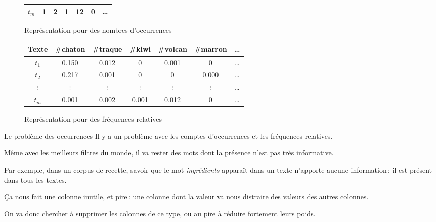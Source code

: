 \documentclass[../allslides.tex]{subfiles}
\begin{document}
\begin{frame}
\begin{overprint}
\begin{figure}
\begin{tabular}{c*{5}{S[table-format=4.0]}c}
					\(t_m\)	& 1	& 2	& 1	& 12	& 0	& …\\
					\bottomrule
				\end{tabular}
				\caption{Représentation pour des nombres d'occurrences}
			\end{figure}
			\begin{figure}
				\begin{tabular}{c*{5}{S}c}
					\toprule
					\textbf{Texte}	& {\textbf{\#chaton}}	& {\textbf{\#traque}}	& {\textbf{\#kiwi}}	& {\textbf{\#volcan}}	& {\textbf{\#marron}}	& {…}\\
					\midrule
					\(t_1\)	& 0.150	& 0.012	& 0	& 0.001	& 0	& …\\
					\(t_2\)	& 0.217	& 0.001	& 0	& 0	& 0.000	& …\\
					\(⋮\)	& \multicolumn{1}{c}{\(⋮\)}	& 	& 	& 	& 	& …\\
					\(t_m\)	& 0.001	& 0.002	& 0.001	& 0.012	& 0	& …\\
					\bottomrule
				\end{tabular}
				\caption{Représentation pour des fréquences relatives}
			\end{figure}
	\end{overprint}
\end{frame}




\begin{frame}{Le problème des occurrences}
	Il y a un problème avec les comptes d'occurrences et les fréquences relatives.

	\pause

	Même avec les meilleurs filtres du monde, il va rester des mots dont la présence n'est pas très \alert{informative}.

	\pause

	Par exemple, dans un corpus de recette, savoir que le mot \emph{ingrédients} apparaît dans un texte n'apporte aucune information : il est \alert{présent dans tous les textes}.

	\pause

	Ça nous fait une colonne inutile, et pire : une colonne dont la valeur va nous distraire des valeurs des autres colonnes.

	\pause

	On va donc chercher à supprimer les colonnes de ce type, ou au pire à \alert{réduire fortement leurs poids}.
\end{frame}
\end{document}
